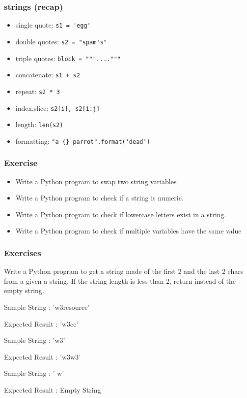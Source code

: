 \begin{frame}[fragile]\frametitle{strings (recap)}
  \begin{itemize}
  \item single quote: \lstinline{s1 = 'egg'}
\item double quotes: \lstinline{s2 = "spam's"}
\item triple quotes: \lstinline{block = """...."""}
\item concatenate: \lstinline{s1 + s2}
\item repeat: \lstinline{s2 * 3}
\item index,slice: \lstinline{s2[i], s2[i:j]}
\item length: \lstinline{len(s2)}
\item formatting: \lstinline|"a {} parrot".format('dead')|
  \end{itemize}
\end{frame}


\begin{frame}[fragile]\frametitle{Exercise}
\begin{itemize}
\item Write a Python program to swap two string variables
\item Write a Python program to check if a string is numeric.
\item Write a Python program to check if lowercase letters exist in a string.
\item Write a Python program to check if multiple variables have the same value
\end{itemize}
\end{frame}

\begin{frame}[fragile]\frametitle{Exercises}
Write a Python program to get a string made of the first 2 and the last 2 chars from a given a string. If the string length is less than 2, return instead of the empty string. 

Sample String : 'w3resource'

Expected Result : 'w3ce'

Sample String : 'w3'

Expected Result : 'w3w3'

Sample String : ' w'

Expected Result : Empty String 
\end{frame}

